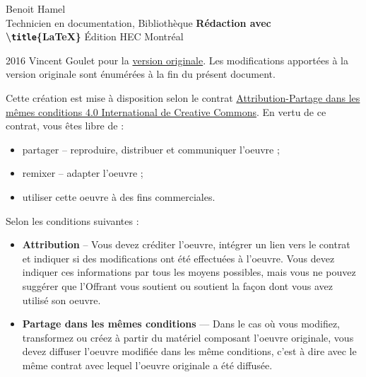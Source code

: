 
\begin{frame}
	
	\tiny
	Benoit Hamel \\
	Technicien en documentation, Bibliothèque
	\vfill
	{\Huge\bfseries Rédaction avec \\
	\textbackslash \texttt{title}\{\textrm{\LaTeX}\}}
	\vfill
	Édition HEC Montréal
	
\end{frame}


\begin{frame}
	
	\tiny
	{\faCopyright} 2016 Vincent Goulet pour la
	\href{https://ctan.org/pkg/formation-latex-ul}{version originale}. Les modifications apportées à
	la version originale sont énumérées à la fin du présent document.
	
	{\faCreativeCommons} Cette création est mise à disposition selon le contrat
	\href{http://creativecommons.org/licenses/by-sa/4.0/deed.fr}%
	{Attribution-Partage dans les mêmes conditions 4.0 International de Creative Commons}.
	En vertu de ce contrat, vous êtes libre de :
	
	\begin{itemize}
		\item partager -- reproduire, distribuer et communiquer l’oeuvre ;
		\item remixer -- adapter l’oeuvre ;
		\item utiliser cette oeuvre à des fins commerciales.
	\end{itemize}

	Selon les conditions suivantes :
	
	\begin{itemize}
		
		\item \textbf{Attribution} -- Vous devez créditer l’oeuvre, intégrer un lien vers le contrat et indiquer si des modifications ont été effectuées	à l’oeuvre. Vous devez indiquer ces informations par tous les moyens possibles, mais vous ne pouvez suggérer que l’Offrant vous soutient ou soutient la façon dont vous avez utilisé son oeuvre.
		
		\item \textbf{Partage dans les mêmes conditions} — Dans le cas où vous modifiez, transformez ou créez à partir du matériel composant l’oeuvre originale, vous devez diffuser l’oeuvre modifiée dans les même conditions, c’est à dire avec le même contrat avec	lequel l’oeuvre originale a été diffusée.
		
	\end{itemize}

\end{frame}

